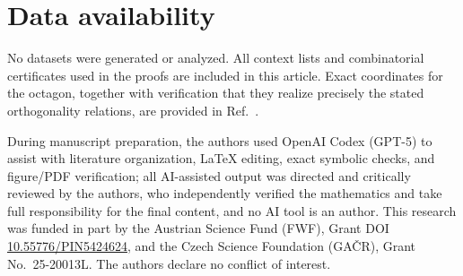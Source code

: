 \documentclass[
  twocolumn,
  aps,
  pra,
  floatfix,
  amsmath,amssymb,
  longbibliography
]{revtex4-2}
\theoremstyle{definition}
\theoremstyle{remark}
\begin{document}
\section*{Data availability} No datasets were generated or analyzed. All context lists and combinatorial certificates used in the proofs are included in this article. Exact coordinates for the octagon, together with verification that they realize precisely the stated orthogonality relations, are provided in Ref.~\cite{2026-Navara-Svozil-complex-only-3d-hypergraphs}. 

\begin{acknowledgments}
During manuscript preparation, the authors used OpenAI Codex (GPT-5) to assist with literature organization, LaTeX editing, exact symbolic checks, and figure/PDF verification; all AI-assisted output was directed and critically reviewed by the authors, who independently verified the mathematics and take full responsibility for the final content, and no AI tool is an author.
This research was funded in part by the Austrian
Science Fund (FWF), Grant DOI \href{https://doi.org/10.55776/PIN5424624}{10.55776/PIN5424624}, and the Czech Science
Foundation (GA\v{C}R), Grant No.~25-20013L.  The authors declare no
conflict of interest.
\end{acknowledgments}


\end{document}
